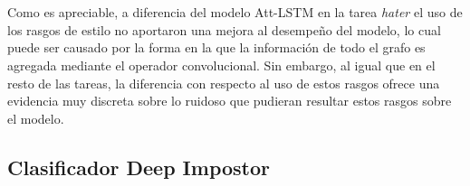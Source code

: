 	\\\\
	Como es apreciable, a diferencia del modelo Att-LSTM en la tarea \textit{hater} el uso de los rasgos de estilo no aportaron una mejora al desempeño del modelo, lo cual puede ser causado por la forma en la que la información de todo el grafo es agregada mediante el operador convolucional. Sin embargo, al igual que en el resto de las tareas, la diferencia con respecto al uso de estos rasgos ofrece una evidencia muy discreta sobre lo ruidoso que pudieran resultar estos rasgos sobre el modelo.
	
	\subsection{ Clasificador Deep Impostor } 	
	
